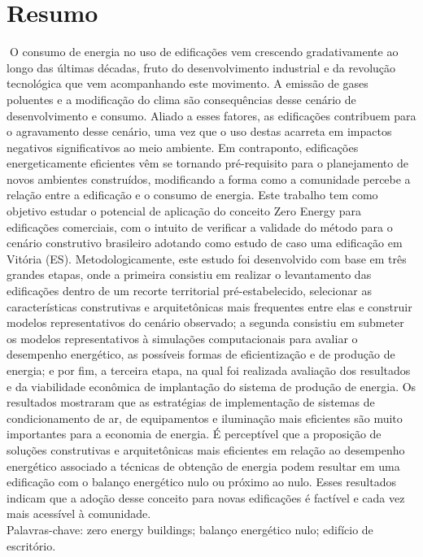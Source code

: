 \section*{Resumo}
    \vspace*{1.5cm} %
    \thispagestyle{empty}
    \begin{onehalfspace}
  \noindent O consumo de energia no uso de edificações vem crescendo gradativamente ao longo das últimas décadas, fruto do desenvolvimento industrial e da revolução tecnológica que vem acompanhando este movimento. A emissão de gases poluentes e a modificação do clima são consequências desse cenário de desenvolvimento e consumo. Aliado a esses fatores, as edificações contribuem para o agravamento desse cenário, uma vez que o uso destas acarreta em impactos negativos significativos ao meio ambiente. Em contraponto, edificações energeticamente eficientes vêm se tornando pré-requisito para o planejamento de novos  ambientes construídos, modificando a forma como a comunidade percebe a relação entre a edificação e  o consumo de energia. Este trabalho tem como objetivo estudar o potencial de aplicação do conceito Zero Energy  para edificações comerciais, com o intuito de verificar a validade do método para o cenário construtivo brasileiro adotando como estudo de caso uma edificação em Vitória (ES). Metodologicamente, este estudo foi desenvolvido com base em três grandes etapas, onde a primeira consistiu em realizar o levantamento das edificações dentro de um recorte territorial pré-estabelecido, selecionar as características construtivas e arquitetônicas mais frequentes entre elas e construir modelos representativos do cenário observado; a segunda consistiu em  submeter os modelos representativos à simulações computacionais para avaliar o desempenho energético, as possíveis formas de eficientização e de produção de energia; e por fim, a terceira etapa, na qual foi realizada avaliação dos resultados e da viabilidade econômica de implantação do sistema de produção de energia. Os resultados mostraram que as estratégias de implementação de sistemas de condicionamento de ar, de equipamentos e iluminação mais eficientes são muito importantes para a economia de energia. É perceptível que a proposição de soluções construtivas e arquitetônicas mais eficientes em relação ao desempenho energético associado a técnicas de obtenção de energia podem resultar em uma edificação com o balanço energético nulo ou próximo ao nulo. Esses resultados indicam que a adoção desse conceito para novas edificações é factível e cada vez mais acessível à comunidade.\\
    
    \noindent Palavras-chave: zero energy buildings; balanço energético nulo; edifício de escritório.\pagebreak
    \end{onehalfspace}
